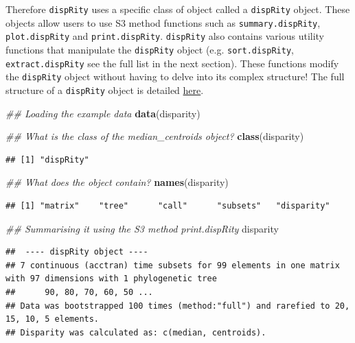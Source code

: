 \documentclass[]{book}
\newenvironment{Shaded}{\begin{snugshade}}{\end{snugshade}}
\newcommand{\CommentTok}[1]{\textcolor[rgb]{0.56,0.35,0.01}{\textit{#1}}}
\newcommand{\KeywordTok}[1]{\textcolor[rgb]{0.13,0.29,0.53}{\textbf{#1}}}
\newcommand{\NormalTok}[1]{#1}
\begin{document}
Therefore \texttt{dispRity} uses a specific class of object called a \texttt{dispRity} object.
These objects allow users to use S3 method functions such as \texttt{summary.dispRity}, \texttt{plot.dispRity} and \texttt{print.dispRity}.
\texttt{dispRity} also contains various utility functions that manipulate the \texttt{dispRity} object (e.g. \texttt{sort.dispRity}, \texttt{extract.dispRity} see the full list in the next section).
These functions modify the \texttt{dispRity} object without having to delve into its complex structure!
The full structure of a \texttt{dispRity} object is detailed \href{https://github.com/TGuillerme/dispRity/blob/master/disparity_object.md}{here}.

\begin{Shaded}
\begin{Highlighting}[]
\CommentTok{## Loading the example data}
\KeywordTok{data}\NormalTok{(disparity)}

\CommentTok{## What is the class of the median_centroids object?}
\KeywordTok{class}\NormalTok{(disparity)}
\end{Highlighting}
\end{Shaded}

\begin{verbatim}
## [1] "dispRity"
\end{verbatim}

\begin{Shaded}
\begin{Highlighting}[]
\CommentTok{## What does the object contain?}
\KeywordTok{names}\NormalTok{(disparity)}
\end{Highlighting}
\end{Shaded}

\begin{verbatim}
## [1] "matrix"    "tree"      "call"      "subsets"   "disparity"
\end{verbatim}

\begin{Shaded}
\begin{Highlighting}[]
\CommentTok{## Summarising it using the S3 method print.dispRity}
\NormalTok{disparity}
\end{Highlighting}
\end{Shaded}

\begin{verbatim}
##  ---- dispRity object ---- 
## 7 continuous (acctran) time subsets for 99 elements in one matrix with 97 dimensions with 1 phylogenetic tree
##      90, 80, 70, 60, 50 ...
## Data was bootstrapped 100 times (method:"full") and rarefied to 20, 15, 10, 5 elements.
## Disparity was calculated as: c(median, centroids).
\end{verbatim}
\end{document}
